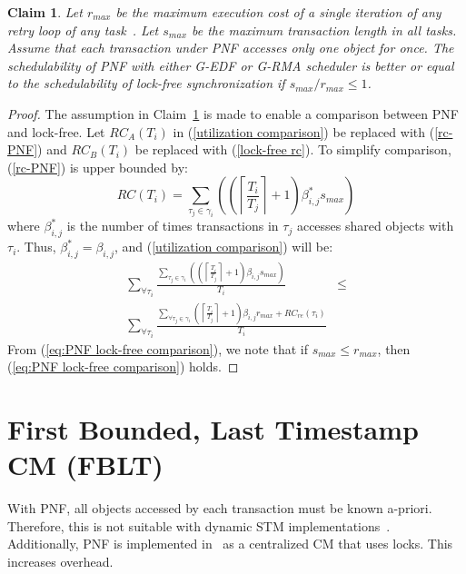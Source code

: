 \documentclass[a4paper,english]{article}
\newtheorem{clm}{Claim}
\newtheorem{proof}{Proof}
\begin{document}
\begin{clm}\label{PNF lock-free comparison}
Let $r_{max}$ be the maximum execution cost of a single iteration of any retry loop of any task~\cite{key-5}. Let $s_{max}$ be the maximum transaction length in all tasks. Assume that each transaction under PNF accesses only one object for once. The schedulability of PNF with either G-EDF or G-RMA scheduler is better or equal to the schedulability of lock-free
synchronization if $s_{max}/r_{max}\le 1$.
\end{clm}
\begin{proof}\normalfont
The assumption in Claim~\ref{PNF lock-free comparison} is made to enable a comparison between PNF and lock-free. Let $RC_{A}(T_{i})$ in (\ref{utilization comparison}) be replaced
with (\ref{rc-PNF}) and $RC_{B}(T_{i})$ be replaced with (\ref{lock-free rc}).
To simplify comparison, (\ref{rc-PNF}) is upper bounded by:
%
\begin{equation*}
RC(T_{i})=\sum_{\tau_{j}\in\gamma_{i}}\left(\left(\left\lceil \frac{T_{i}}{T_{j}}\right\rceil +1\right)\beta_{i,j}^* s_{max}\right)
\end{equation*}
%
where $\beta_{i,j}^*$ is the number of times transactions in $\tau_j$ accesses shared objects with $
\tau_i$. Thus, $\beta_{i,j}^* = \beta_{i,j}$, and (\ref{utilization comparison}) will be:
\begin{eqnarray}
\sum_{\forall\tau_{i}}\frac{\sum_{\tau_{j}\in\gamma_{i}}\left(\left(\left\lceil \frac{T_{i}}{T_{j}}\right\rceil +1\right)\beta_{i,j}s_{max}\right)}{T_{i}} & \le\nonumber \\
\sum_{\forall\tau_{i}}\frac{\sum_{\forall\tau_{j}\in\gamma_{i}}\left(\left\lceil \frac{T_{i}}{T_{j}}\right\rceil +1\right)\beta_{i,j}r_{max}+RC_{re}(\tau_i)}{T_{i}}\label{eq:PNF lock-free comparison}
\end{eqnarray}
From (\ref{eq:PNF lock-free comparison}), we note that if $s_{max}\le r_{max}$,
then (\ref{eq:PNF lock-free comparison}) holds. 
\end{proof}

\section{First Bounded, Last Timestamp CM (FBLT)}
With PNF, all objects accessed by each transaction must be known a-priori. Therefore, this is not suitable with dynamic STM implementations~\cite{Herlihy:2003:STM:872035.872048}. Additionally, PNF is implemented in~\cite{shambake_phd_proposal} as a centralized CM that uses locks. This increases overhead. 
\end{document}
